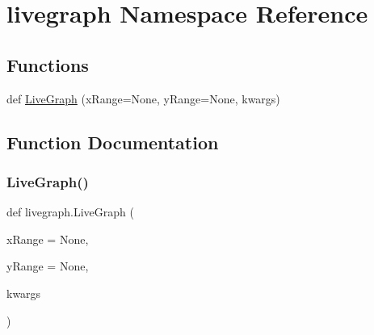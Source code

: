 \hypertarget{namespacelivegraph}{}\section{livegraph Namespace Reference}
\label{namespacelivegraph}
\subsection*{Functions}
\begin{DoxyCompactItemize}
\item 
def \hyperlink{namespacelivegraph_aee36bd101e4ca90cf4635c2c7f3da10e}{Live\+Graph} (x\+Range=None, y\+Range=None, kwargs)
\end{DoxyCompactItemize}


\subsection{Function Documentation}
\mbox{\label{namespacelivegraph_aee36bd101e4ca90cf4635c2c7f3da10e}} 
\subsubsection{\texorpdfstring{Live\+Graph()}{LiveGraph()}}
{\footnotesize\ttfamily def livegraph.\+Live\+Graph (\begin{DoxyParamCaption}\item[{}]{x\+Range = {\ttfamily None},  }\item[{}]{y\+Range = {\ttfamily None},  }\item[{}]{kwargs }\end{DoxyParamCaption})}

